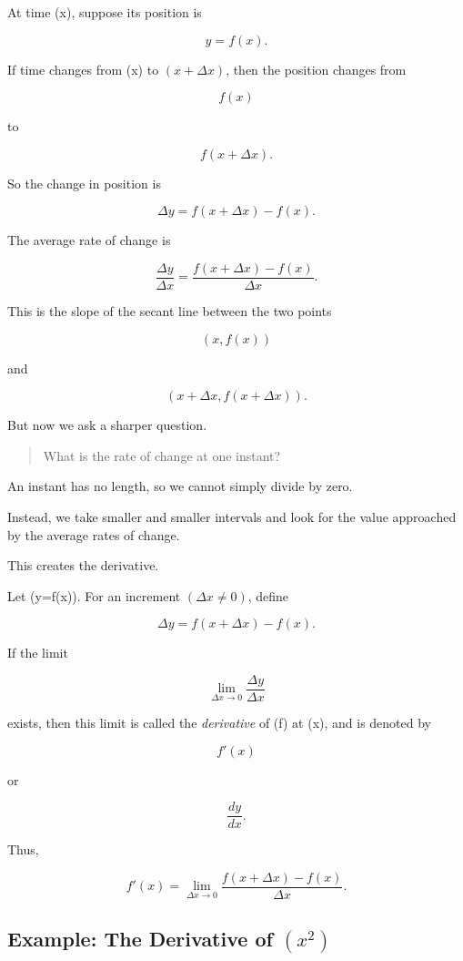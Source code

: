At time (x), suppose its position is

\[
y=f(x).
\]

If time changes from (x) to $(x+\Delta x)$, then the position changes from

\[
f(x)
\]

to

\[
f(x+\Delta x).
\]

So the change in position is

\[
\Delta y=f(x+\Delta x)-f(x).
\]

The average rate of change is

\[
\frac{\Delta y}{\Delta x} = \frac{f(x+\Delta x)-f(x)}{\Delta x}.
\]

This is the slope of the secant line between the two points

\[
(x,f(x))
\]

and

\[
(x+\Delta x,f(x+\Delta x)).
\]

But now we ask a sharper question.

\begin{quote}
What is the rate of change at one instant?
\end{quote}

An instant has no length, so we cannot simply divide by zero.

Instead, we take smaller and smaller intervals and look for the value approached by the average rates of change.

This creates the derivative.

\begin{definition}
Let (y=f(x)). For an increment $(\Delta x\neq 0)$, define

\[
\Delta y=f(x+\Delta x)-f(x).
\]

If the limit

\[
\lim_{\Delta x\to 0}
\frac{\Delta y}{\Delta x}
\]

exists, then this limit is called the \emph{derivative} of (f) at (x), and is denoted by

\[
f'(x)
\]

or

\[
\frac{dy}{dx}.
\]

Thus,

\[
f'(x) = \lim_{\Delta x\to 0} \frac{f(x+\Delta x)-f(x)}{\Delta x}.
\]
\end{definition}

\subsection{Example: The Derivative of $(x^2)$}

